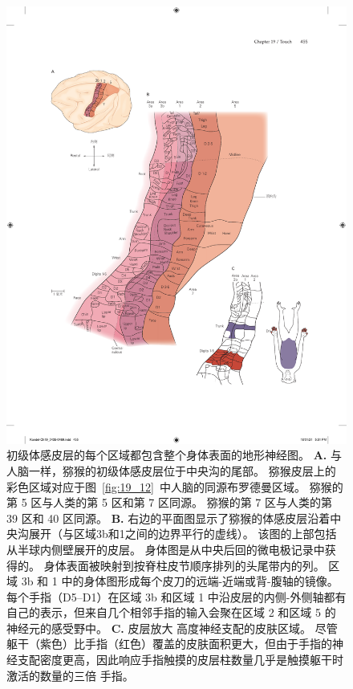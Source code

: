 \begin{figure}[htbp]
	\centering
	\includegraphics[width=0.95\linewidth]{chap19/fig_19_15}
	\caption{初级体感皮层的每个区域都包含整个身体表面的地形神经图\cite{nelson1980representations}。
		\textbf{A.} 与人脑一样，猕猴的初级体感皮层位于中央沟的尾部。
		猕猴皮层上的彩色区域对应于图~\ref{fig:19_12}~中人脑的同源布罗德曼区域。
		猕猴的第 5 区与人类的第 5 区和第 7 区同源。
		猕猴的第 7 区与人类的第 39 区和 40 区同源。
		\textbf{B.} 右边的平面图显示了猕猴的体感皮层沿着中央沟展开（与区域3b和1之间的边界平行的虚线）。
		该图的上部包括从半球内侧壁展开的皮层。
		身体图是从中央后回的微电极记录中获得的。
		身体表面被映射到按脊柱皮节顺序排列的头尾带内的列。
		区域 3b 和 1 中的身体图形成每个皮刀的远端-近端或背-腹轴的镜像。
		每个手指（D5–D1）在区域 3b 和区域 1 中沿皮层的内侧-外侧轴都有自己的表示，但来自几个相邻手指的输入会聚在区域 2 和区域 5 的神经元的感受野中。
		\textbf{C.} 皮层放大 高度神经支配的皮肤区域。
		尽管躯干（紫色）比手指（红色）覆盖的皮肤面积更大，但由于手指的神经支配密度更高，因此响应手指触摸的皮层柱数量几乎是触摸躯干时激活的数量的三倍 手指。}
	\label{fig:19_15}
\end{figure}


